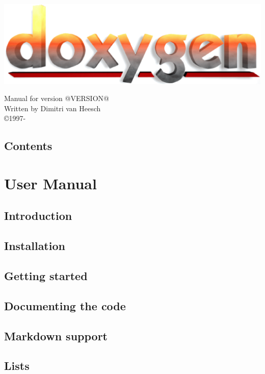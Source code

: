 \documentclass{book}
\newcommand{\+}{\discretionary{\mbox{\scriptsize$\hookleftarrow$}}{}{}}
\newcommand{\thisyear}{\the\year}
\begin{document}
\begin{titlepage}
\includegraphics[width=\textwidth]{doxygen_logo}
\begin{center}
Manual for version @VERSION@\\[2ex]
Written by Dimitri van Heesch\\[2ex]
\copyright 1997-\thisyear
\end{center}
\end{titlepage}
\clearemptydoublepage
{}
\chapter*{Contents}
\tableofcontents
\clearemptydoublepage
{}
\part{User Manual}
\chapter{Introduction}\label{intro}\hypertarget{intro}{}
\chapter{Installation}\label{install}\hypertarget{install}{}
\chapter{Getting started}\label{starting}\hypertarget{starting}{}
\chapter{Documenting the code}\label{docblocks}\hypertarget{docblocks}{}
\chapter{Markdown support}\label{markdown}\hypertarget{markdown}{}
\chapter{Lists}\label{lists}\hypertarget{lists}{}
\end{document}
